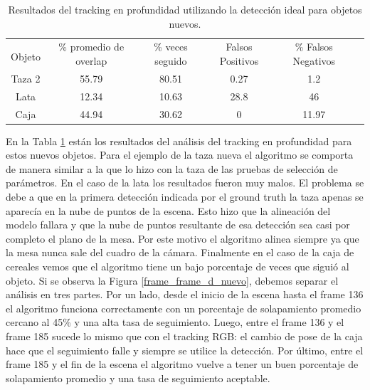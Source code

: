 \begin{table}[h]
	\centering
    \begin{tabular}{|c|c|c|c|c|c|}
    \hline
    & \multirow{2}{2.4cm}{\% promedio de overlap} & \multirow{2}{2cm}{\% veces seguido} & \multirow{2}{1.6cm}{Falsos Positivos} & \multirow{2}{1.6cm}{\% Falsos Negativos}\\
	Objeto & & & &\\
    \hline
    Taza 2  & 55.79      & 80.51     & 0.27     &   1.2 \\
    \hline
    Lata    & 12.34      & 10.63     & 28.8     &    46 \\
    \hline
    Caja    & 44.94      & 30.62     & 0        & 11.97 \\
    \hline
    \end{tabular}
\caption{Resultados del tracking en profundidad utilizando la detección ideal para objetos nuevos.}
\label{tabla_d_nuevos}
\end{table}

En la Tabla \ref{tabla_d_nuevos} están los resultados del análisis del tracking en profundidad para estos nuevos objetos. Para el ejemplo de la taza nueva el algoritmo se comporta de manera similar a la que lo hizo con la taza de las pruebas de selección de parámetros. En el caso de la lata los resultados fueron muy malos. El problema se debe a que en la primera detección indicada por el ground truth la taza apenas se aparecía en la nube de puntos de la escena. Esto hizo que la alineación del modelo fallara y que la nube de puntos resultante de esa detección sea casi por completo el plano de la mesa. Por este motivo el algoritmo alinea siempre ya que la mesa nunca sale del cuadro de la cámara.
Finalmente en el caso de la caja de cereales vemos que el algoritmo tiene un bajo porcentaje de veces que siguió al objeto. Si se observa la Figura \ref{frame_frame_d_nuevo}, debemos separar el análisis en tres partes. Por un lado, desde el inicio de la escena hasta el frame 136 el algoritmo funciona correctamente con un porcentaje de solapamiento promedio cercano al 45\% y una alta tasa de seguimiento. Luego, entre el frame 136 y el frame 185 sucede lo mismo que con el tracking RGB: el cambio de pose de la caja hace que el seguimiento falle y siempre se utilice la detección. Por último, entre el frame 185 y el fin de la escena el algoritmo vuelve a tener un buen porcentaje de solapamiento promedio y una tasa de seguimiento aceptable.

